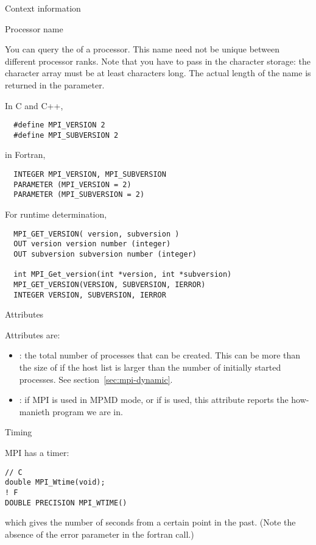  {Context information}
\label{sec:context}

 {Processor name}

You can query the  of a processor.
This name need not be unique between different processor ranks.
%
%
Note that you have to pass in the character storage:
the character array must be at least  characters long.
The actual length of the name is returned in the  parameter.

In C and C++,
\begin{verbatim}
  #define MPI_VERSION 2
  #define MPI_SUBVERSION 2
\end{verbatim}
in Fortran,
\begin{verbatim}
  INTEGER MPI_VERSION, MPI_SUBVERSION
  PARAMETER (MPI_VERSION = 2)
  PARAMETER (MPI_SUBVERSION = 2)
\end{verbatim}
For runtime determination,
\begin{verbatim}
  MPI_GET_VERSION( version, subversion )
  OUT version version number (integer)
  OUT subversion subversion number (integer)

  int MPI_Get_version(int *version, int *subversion)
  MPI_GET_VERSION(VERSION, SUBVERSION, IERROR)
  INTEGER VERSION, SUBVERSION, IERROR
\end{verbatim}

 {Attributes}


Attributes are:
\begin{itemize}
\item {}: the total number of processes
  that can be created. This can be more than the size of
   if the host list is larger than the number of
  initially started processes. See section~\ref{sec:mpi-dynamic}.
\item {}: if MPI is used in \ac{MPMD} mode, or
  if  is used, this attribute
  reports the how-manieth program we are in.
\end{itemize}

 {Timing}

MPI has a  timer: 
\begin{verbatim}
// C
double MPI_Wtime(void);
! F
DOUBLE PRECISION MPI_WTIME()
\end{verbatim}
which gives the number of seconds from a certain point in the past.
(Note the absence of the error parameter in the fortran call.)

